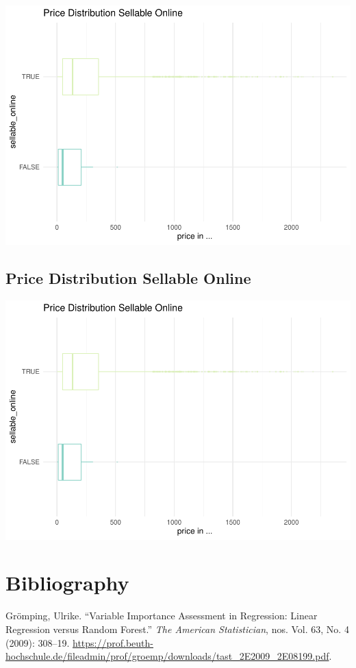 \documentclass[a4paper, nobind]{templates/ociamthesis}
\begin{document}
\includegraphics{_main_files/figure-latex/unnamed-chunk-8-1.pdf}

\hypertarget{price-distribution-sellable-online}{%
\section{Price Distribution Sellable Online}\label{price-distribution-sellable-online}}

\includegraphics{_main_files/figure-latex/unnamed-chunk-9-1.pdf}

\hypertarget{bibliography}{%
\chapter{Bibliography}\label{bibliography}}

\hypertarget{refs}{}
\leavevmode\hypertarget{ref-Groemping2009}{}%
Grömping, Ulrike. ``Variable Importance Assessment in Regression: Linear Regression versus Random Forest.'' \emph{The American Statistician}, nos. Vol. 63, No. 4 (2009): 308--19. \url{https://prof.beuth-hochschule.de/fileadmin/prof/groemp/downloads/tast_2E2009_2E08199.pdf}.
\end{document}
